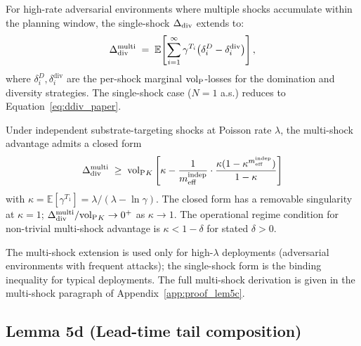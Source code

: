 \begin{remark}
\label{rem:multishock}
For high-rate adversarial environments where multiple shocks
accumulate within the planning window, the single-shock $\Delta_{\mathrm{div}}$
extends to:
\[
  \Delta_{\mathrm{div}}^{\mathrm{multi}} \;=\; \mathbb{E}\!\left[\sum_{i=1}^{\infty}
  \gamma^{T_i} \bigl(\delta_i^D - \delta_i^{\mathrm{div}}\bigr)\right],
\]
where $\delta_i^{D}, \delta_i^{\mathrm{div}}$ are the per-shock
marginal ${\operatorname{vol}_{\mathrm{P}}}$-losses for the domination and diversity strategies.
The single-shock case ($N = 1$ a.s.) reduces to
Equation~\ref{eq:ddiv_paper}.

Under independent substrate-targeting shocks at Poisson rate
$\lambda$, the multi-shock advantage admits a closed form
\[
  \Delta_{\mathrm{div}}^{\mathrm{multi}} \;\geq\; {\operatorname{vol}_{\mathrm{P}}}_K \left[\kappa -
  \frac{1}{m_{\mathrm{eff}}^{\mathrm{indep}}} \cdot \frac{\kappa(1 - \kappa^{m_{\mathrm{eff}}^{\mathrm{indep}}})}
  {1 - \kappa}\right]
\]
with $\kappa = \mathbb{E}[\gamma^{T_1}] = \lambda/(\lambda - \ln \gamma)$.
The closed form has a removable singularity at $\kappa = 1$;
$\Delta_{\mathrm{div}}^{\mathrm{multi}}/{\operatorname{vol}_{\mathrm{P}}}_K \to 0^+$ as $\kappa \to 1$. The
operational regime condition for non-trivial multi-shock advantage
is $\kappa < 1 - \delta$ for stated $\delta > 0$.

The multi-shock extension is used only for high-$\lambda$
deployments (adversarial environments with frequent attacks); the
single-shock form is the binding inequality for typical deployments.
The full multi-shock derivation is given in the multi-shock
paragraph of Appendix~\ref{app:proof_lem5c}.
\end{remark}

\subsection{Lemma 5d (Lead-time tail composition)}
\label{sec:lem5d}

